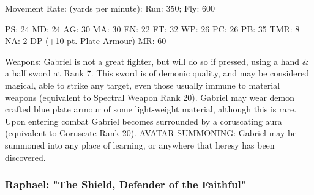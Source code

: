 \begin{Description}
Movement Rate: (yards per minute): Run: 350; Fly: 600

PS: 24	MD: 24	AG: 30	MA: 30
EN: 22	FT: 32	WP: 26	PC: 26
PB: 35	TMR: 8	NA: 2 DP (+10 pt. Plate Armour)
MR: 60

Weapons: Gabriel is not a great fighter, but will do so if pressed, using a hand \& a half sword at Rank 7. This sword is of demonic quality, and may be considered magical, able to strike any target, even those usually immune to material weapons (equivalent to Spectral Weapon Rank 20). Gabriel may wear demon crafted blue plate armour of some light-weight material, although this is rare. Upon entering combat Gabriel becomes surrounded by a coruscating aura (equivalent to Coruscate Rank 20).
AVATAR SUMMONING: Gabriel may be summoned into any place of learning, or anywhere that heresy has been discovered.
\end{Description}

\subsubsection{Raphael: "The Shield, Defender of the Faithful"}

